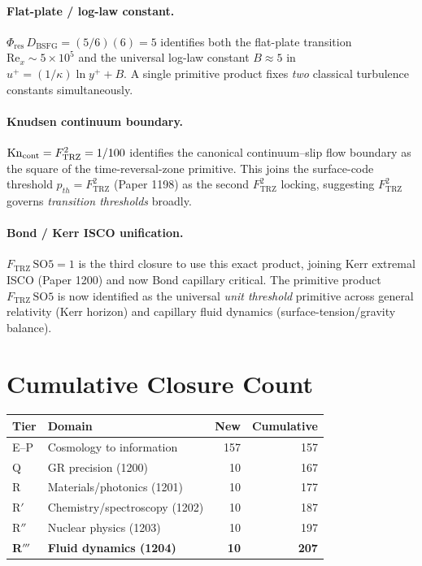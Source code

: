 \documentclass[11pt]{article}
\newcommand{\Ftrz}{F_{\mathrm{TRZ}}}
\newcommand{\Phires}{\Phi_{\mathrm{res}}}
\newcommand{\Dbsfg}{D_{\mathrm{BSFG}}}
\newcommand{\SOfive}{\mathrm{SO5}}
\begin{document}
\paragraph{Flat-plate / log-law constant.}
$\Phires\,\Dbsfg = (5/6)(6) = 5$ identifies both the flat-plate transition
$\mathrm{Re}_x \sim 5\times 10^5$ and the universal log-law constant $B\approx 5$
in $u^+ = (1/\kappa)\ln y^+ + B$. A single primitive product fixes \emph{two}
classical turbulence constants simultaneously.

\paragraph{Knudsen continuum boundary.}
$\mathrm{Kn}_{\rm cont} = \Ftrz^2 = 1/100$ identifies the canonical
continuum--slip flow boundary as the square of the time-reversal-zone primitive.
This joins the surface-code threshold $p_{th} = \Ftrz^2$ (Paper 1198) as
the second $\Ftrz^2$ locking, suggesting $\Ftrz^2$ governs
\emph{transition thresholds} broadly.

\paragraph{Bond / Kerr ISCO unification.}
$\Ftrz\,\SOfive = 1$ is the third closure to use this exact product, joining
Kerr extremal ISCO (Paper 1200) and now Bond capillary critical. The primitive
product $\Ftrz\,\SOfive$ is now identified as the universal \emph{unit
threshold} primitive across general relativity (Kerr horizon) and capillary
fluid dynamics (surface-tension/gravity balance).

\section{Cumulative Closure Count}

\begin{tabular}{@{}llrr@{}}
\toprule
Tier & Domain & New & Cumulative \\
\midrule
E--P & Cosmology to information & 157 & 157 \\
Q & GR precision (1200) & 10 & 167 \\
R & Materials/photonics (1201) & 10 & 177 \\
R$'$ & Chemistry/spectroscopy (1202) & 10 & 187 \\
R$''$ & Nuclear physics (1203) & 10 & 197 \\
\textbf{R$'''$} & \textbf{Fluid dynamics (1204)} & \textbf{10} & \textbf{207} \\
\bottomrule
\end{tabular}
\end{document}

